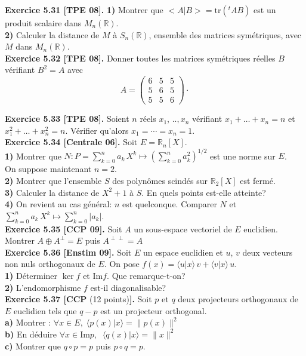 \documentclass[a4paper,12pt,francais]{article}
\newcommand{\field}[1]{\mathbb{#1}}
\newcommand{\R}{\field{R}}
\newcommand{\im}{\mbox{Im}}
\newcommand{\tr}{\mbox{tr}}
\begin{document}
\noindent
{\bf Exercice 5.31 [TPE 08].} {\bf 1)} Montrer que $<A|B>=\tr (^tAB)$ est un produit scalaire dans $M_n(\R)$.\\
{\bf 2)} Calculer la distance de $M$ à $S_n(\R)$, ensemble des matrices symétriques, avec $M$ dans $M_n(\R)$.\\

\noindent
{\bf Exercice 5.32 [TPE 08].} Donner toutes les matrices symétriques réelles $B$ vérifiant $B^2=A$ avec 
$$A=\left( {
\begin{array}{ccc}
6&5&5\\
5&6&5\\
5&5&6
\end{array}
}\right)\cdot$$ 

\noindent
{\bf Exercice 5.33 [TPE 08].} Soient $n$ réels $x_1$, ..$,x_n$ vérifiant $x_1+\dots+x_n=n$
 et $x_1^2+\dots+x_n^2=n$. Vérifier qu'alors $x_1=\cdots=x_n=1$.\\

\noindent
{\bf Exercice 5.34 [Centrale 06].} Soit $E=\R_n[X]$.\\
{\bf 1)} Montrer que $N:P=\displaystyle \sum_{k=0}^n a_k \, X^k \mapsto \left( {\sum_{k=0}^n a_k^2}\right)^{1/2}$ est une norme sur $E$.\\
On suppose maintenant $n=2$.\\
{\bf 2)} Montrer que l'ensemble $S$ des polynômes scindés sur $\R_2[X]$ est fermé.\\
{\bf 3)} Calculer la distance de $X^2+1$ à $S$. En quels points est-elle atteinte?\\
{\bf 4)} On revient au cas général: $n$ est quelconque. Comparer $N$ et $\displaystyle \sum_{k=0}^n a_k \, X^k \mapsto \sum_{k=0}^n |a_k|$.\\

\noindent
{\bf Exercice 5.35 [CCP 09].} Soit $A$ un sous-espace vectoriel de $E$ euclidien. Montrer $A \oplus A^\perp =E$ puis $A^{\perp \perp}=A$\\

\noindent
{\bf Exercice 5.36 [Enstim 09].} Soit $E$ un espace euclidien et $u$, $v$ deux vecteurs non nuls orthogonaux de $E$. On pose $f(x)=\langle u|x\rangle \, v +\langle v |x\rangle \, u$.\\
{\bf 1)}  Déterminer $\ker f$ et $\im f$. Que remarque-t-on?\\
{\bf 2)} L'endomorphisme $f$ est-il diagonalisable?\\

\noindent
{\bf Exercice 5.37 [CCP} (12 points){\bf ].} Soit $p$ et $q$ deux projecteurs orthogonaux de $E$ euclidien tels que $q-p$ est un projecteur orthogonal.\\
{\bf a)} Montrer : $\forall x \in E,\; \langle p(x)|x \rangle= \|p(x)\|^2$\\
{\bf b)} En déduire $ \forall x \in \im p,\; \; \langle q(x)|x \rangle =\|x\|^2$\\
{\bf c)} Montrer que $q\circ p= p$ puis $p \circ q=p$.\\
\end{document}
